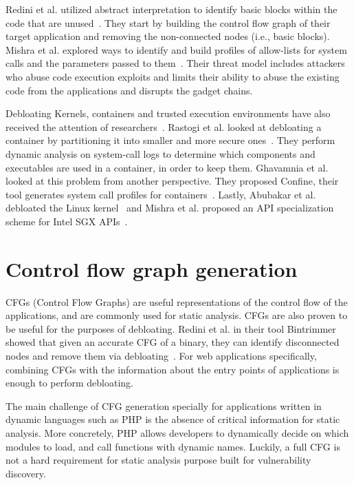 Redini et al. utilized abstract interpretation to identify basic blocks within the code that are unused~\cite{redini2019b}. 
They start by building the control flow graph of their target application and removing the non-connected nodes (i.e., basic blocks). 
Mishra et al. explored ways to identify and build profiles of allow-lists for system calls and the parameters passed to them~\cite{mishra2018shredder,mishra2020saffire}. 
Their threat model includes attackers who abuse code execution exploits and limits their ability to abuse the existing code from the applications and disrupts the gadget chains. 

Debloating Kernels, containers and trusted execution environments have also received the attention of researchers~\cite{abubakar2021shard,mishra2021sgxpecial}. 
Rastogi et al. looked at debloating a container by partitioning it into smaller and more secure ones~\cite{rastogi2017Cimplifier}. They perform dynamic analysis on system-call logs to determine which components and executables are used in a container, in order to keep them. 
Ghavamnia et al. looked at this problem from another perspective. 
They proposed Confine, their tool generates system call profiles for containers~\cite{259711}.
Lastly, Abubakar et al. debloated the Linux kernel~\cite{abubakar2021shard} and Mishra et al. proposed an API specialization scheme for Intel SGX APIs~\cite{mishra2021sgxpecial}.

\section{Control flow graph generation}
CFGs (Control Flow Graphs) are useful representations of the control flow of the applications, and are commonly used for static analysis. 
CFGs are also proven to be useful for the purposes of debloating. 
Redini et al. in their tool Bintrimmer showed that given an accurate CFG of a binary, they can identify disconnected nodes and remove them via debloating~\cite{redini2019b}. 
For web applications specifically, combining CFGs with the information about the entry points of applications is enough to perform debloating. 

The main challenge of CFG generation specially for applications written in dynamic languages such as PHP is the absence of critical information for static analysis. 
More concretely, PHP allows developers to dynamically decide on which modules to load, and call functions with dynamic names. 
Luckily, a full CFG is not a hard requirement for static analysis purpose built for vulnerability discovery. 

